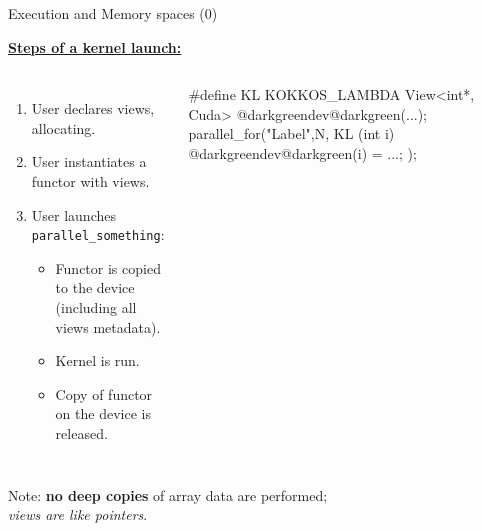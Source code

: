 \ifmedium
\begin{frame}[fragile]{Execution and Memory spaces (0)}

  \ul{\textbf{Steps of a kernel launch:}}

  \vspace{-10pt}

  \begin{columns}[t,onlytextwidth]


      \begin{enumerate}
        \item{User declares views, allocating.}
        \item{User instantiates a functor with views.}
        \item{User launches \texttt{parallel\_something}:}
        \begin{itemize}
          \item{Functor is copied to the device (including all views metadata).}
          \item{Kernel is run.}
          \item{Copy of functor on the device is released.}
        \end{itemize}
      \end{enumerate}


      \vspace{10pt}

      \begin{code}[keywords={}]
#define KL KOKKOS_LAMBDA
View<int*, Cuda> @darkgreendev@darkgreen(...);
parallel_for("Label",N,
  KL (int i) {
    @darkgreendev@darkgreen(i) = ...;
  });
      \end{code}

      \vspace{20pt}

  \end{columns}

  \vspace{20pt}

  Note: \textbf{no deep copies} of array data are performed; \\
    \hspace{30pt}\emph{views are like pointers}.

\end{frame}
\fi


